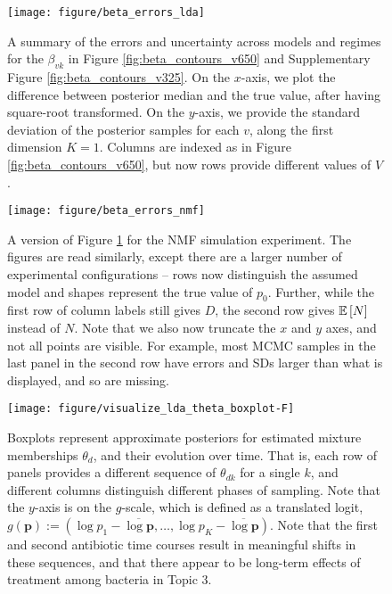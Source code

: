\documentclass[oupdraft]{bio}
\begin{document}
\begin{figure}[!p]
  \centering
  \texttt{[image: figure/beta\_errors\_lda]}
  \caption{A summary of the errors and uncertainty across models and regimes for
    the $\beta_{vk}$ in Figure \ref{fig:beta_contours_v650} and Supplementary
    Figure \ref{fig:beta_contours_v325}. On the $x$-axis, we plot the difference
    between posterior median and the true value, after having square-root
    transformed. On the $y$-axis, we provide the standard deviation of the
    posterior samples for each $v$, along the first dimension $K = 1$. Columns
    are indexed as in Figure \ref{fig:beta_contours_v650}, but now rows provide
    different values of $V$.
    \label{fig:beta_errors_lda} }
\end{figure}

\begin{figure}[!p]
  \centering
  \texttt{[image: figure/beta\_errors\_nmf]}
  \caption{A version of Figure \ref{fig:beta_errors_lda} for the NMF simulation
    experiment. The figures are read similarly, except there are a larger number
    of experimental configurations -- rows now distinguish the assumed model and
    shapes represent the true value of $p_{0}$. Further, while the first row of
    column labels still gives $D$, the second row gives $\mathbb{E}\left[{N}\right]$ instead of
    $N$. Note that we also now truncate the $x$ and $y$ axes, and not all points
    are visible. For example, most MCMC samples in the last panel in the second
    row have errors and SDs larger than what is displayed, and so are
    missing. \label{fig:beta_errors_zinf}}
\end{figure}

\begin{figure}[!p]
  \centering\texttt{[image: figure/visualize\_lda\_theta\_boxplot-F]}
  \caption{Boxplots represent approximate posteriors for estimated mixture
    memberships $\theta_{d}$, and their evolution over time. That is, each row
    of panels provides a different sequence of $\theta_{dk}$ for a single $k$,
    and different columns distinguish different phases of sampling. Note that
    the $y$-axis is on the $g$-scale, which is defined as a translated logit,
    $g\left(\mathbf{p}\right) := \left(\log p_{1} - \overline{\log \mathbf{p}},
    \dots,\log p_{K} - \overline{\log \mathbf{p}}\right)$. Note that the first
    and second antibiotic time courses result in meaningful shifts in these
    sequences, and that there appear to be long-term effects of treatment among
    bacteria in Topic 3. \label{fig:antibiotics_lda_theta}}
\end{figure}
\end{document}
